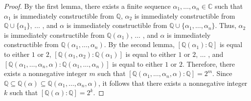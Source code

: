 \documentclass[12pt]{article}
\begin{document}
\begin{proof}
By the first lemma, there exists a finite sequence $\alpha_1,\dots ,\alpha_n\in\mathbb{C}$ such that $\alpha_1$ is immediately constructible from $\mathbb{Q}$, $\alpha_2$ is immediately constructible from $\mathbb{Q} \cup \{\alpha_1\}$, $\dots$ , and $\alpha$ is immediately constructible from $\mathbb{Q} \cup \{\alpha_1,\dots ,\alpha_n\}$.  Thus, $\alpha_2$ is immediately constructible from $\mathbb{Q}(\alpha_1)$, $\dots$ , and $\alpha$ is immediately constructible from $\mathbb{Q}(\alpha_1,\dots ,\alpha_n)$.  By the second lemma, $[\mathbb{Q}(\alpha_1)\!:\!\mathbb{Q}]$ is equal to either $1$ or $2$, $[\mathbb{Q}(\alpha_1,\alpha_2)\!:\!\mathbb{Q}(\alpha_1)]$ is equal to either $1$ or $2$, $\dots$ , and $[\mathbb{Q}(\alpha_1, \dots ,\alpha_n,\alpha)\!:\!\mathbb{Q}(\alpha_1, \dots ,\alpha_n)]$ is equal to either $1$ or $2$.  Therefore, there exists a nonnegative integer $m$ such that $[\mathbb{Q}(\alpha_1, \dots ,\alpha_n,\alpha)\!:\!\mathbb{Q}]=2^m$.  Since $\mathbb{Q} \subseteq \mathbb{Q}(\alpha) \subseteq \mathbb{Q}(\alpha_1, \dots ,\alpha_n,\alpha)$, it follows that there exists a nonnegative integer $k$ such that $[\mathbb{Q}(\alpha)\!:\!\mathbb{Q}]=2^k$.
\end{proof}
\end{document}
